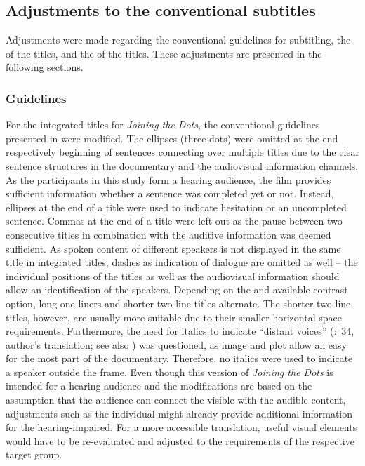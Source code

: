   
\subsection{Adjustments to the conventional subtitles}\label{sec:7.5.3}

Adjustments were made regarding the conventional guidelines for subtitling, the  of the titles, and the  of the titles. These adjustments are presented in the following sections.

\subsubsection{Guidelines}\label{sec:7.5.3.1}

For the integrated titles for \textit{Joining the Dots}, the conventional guidelines presented in  were modified. The ellipses (three dots) were omitted at the end respectively beginning of sentences connecting over multiple titles due to the clear sentence structures in the documentary and the audiovisual information channels. As the participants in this study form a hearing audience, the film provides sufficient information whether a sentence was completed yet or not. Instead, ellipses at the end of a title were used to indicate hesitation or an uncompleted sentence. Commas at the end of a title were left out as the pause between two consecutive titles in combination with the auditive information was deemed sufficient. As spoken content of different speakers is not displayed in the same title in integrated titles, dashes as indication of dialogue are omitted as well – the individual positions of the titles as well as the audiovisual information should allow an identification of the speakers. Depending on the  and available contrast option, long one-liners and shorter two-line titles alternate. The shorter two-line titles, however, are usually more suitable due to their smaller horizontal space requirements. Furthermore, the need for italics to indicate “distant voices” (\citealt{Leisner2009}:~34, author’s translation; see also ) was questioned, as image and plot allow an easy  for the most part of the documentary. Therefore, no italics were used to indicate a speaker outside the frame. Even though this version of \textit{Joining the Dots} is intended for a hearing audience and the modifications are based on the assumption that the audience can connect the visible with the audible content, adjustments such as the individual  might already provide additional information for the hearing-impaired. For a more accessible translation, useful visual elements would have to be re-evaluated and adjusted to the requirements of the respective target group.

